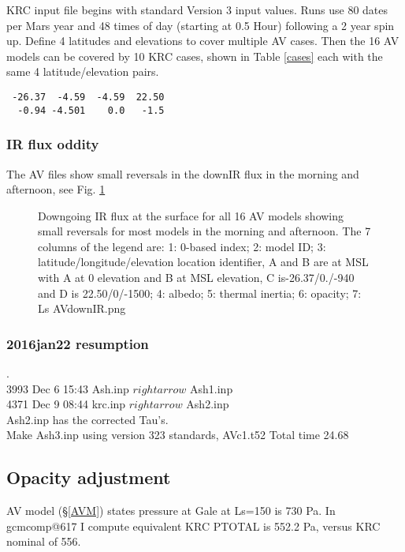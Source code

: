\documentclass{article}
\begin{document}
KRC input file begins with standard Version 3 input values. Runs use 80 dates per Mars year and 48 times of day (starting at 0.5 Hour) following a 2 year spin up. Define 4 latitudes and elevations to cover multiple AV cases.
Then the 16 AV models can be covered by 10 KRC cases, shown in Table \ref{cases} each with the same 4 latitude/elevation pairs. 
\vspace{-3.mm} 
\begin{verbatim}
 -26.37  -4.59  -4.59  22.50
  -0.94 -4.501    0.0   -1.5
\end{verbatim}


\subsubsection{IR flux oddity} %
 The AV files show small reversals in the downIR flux in the morning and afternoon, see Fig. \ref{AVdownIR}
\begin{figure}[!ht] 
\caption[AV down IR]{Downgoing IR flux at the surface for all 16 AV models showing small reversals for most models in the morning and afternoon. The 7 columns of the legend are: 1: 0-based index; 2: model ID; 3: latitude/longitude/elevation location identifier, A and B are at MSL with A at 0 elevation and B at MSL elevation, C is-26.37/0./-940 and D is 22.50/0/-1500; 4: albedo; 5: thermal inertia; 6: opacity; 7: Ls
\label{AVdownIR} AVdownIR.png }
\end{figure} 


\subsubsection{2016jan22 resumption} %
. 
\\  3993 Dec  6 15:43 Ash.inp $rightarrow$ Ash1.inp
\\ 4371 Dec  9 08:44 krc.inp $rightarrow$ Ash2.inp
\\ Ash2.inp has the corrected Tau's.
\\ Make Ash3.inp using version 323 standards,  AVc1.t52  Total time 24.68

\clearpage
\subsection{Opacity adjustment} %
AV model (\S \ref{AVM}) states pressure at Gale at Ls=150 is 730 Pa.
In gcmcomp@617 I compute equivalent KRC PTOTAL is 552.2 Pa, versus KRC nominal of 556.
\end{document}
